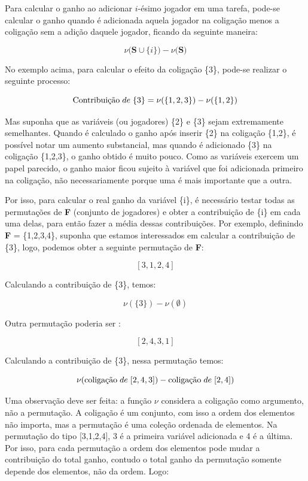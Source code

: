 Para calcular o ganho ao adicionar $i$-ésimo jogador em uma tarefa, 
pode-se calcular o ganho quando é adicionada aquela jogador na coligação menos a coligação sem 
a adição daquele jogador, ficando da seguinte maneira:

\begin{equation}
  \nu({\textbf{S} \cup \{i\})} - \nu({\textbf{S})}    
\end{equation}


No exemplo acima, para calcular o efeito da coligação \{3\}, pode-se realizar o seguinte processo:

\[
\text{Contribuição} \hspace{1mm} de \hspace{1mm} \{3\} = \nu(\{1,2,3\}) - \nu(\{1,2\})  
\]

Mas suponha que as variáveis (ou jogadores) \{2\} e \{3\} sejam extremamente semelhantes. Quando é calculado o 
ganho após inserir \{2\} na coligação \{1,2\}, é possível notar um aumento substancial, mas quando é adicionado 
\{3\} na coligação \{1,2,3\}, o ganho obtido é muito pouco. Como as variáveis exercem um papel parecido,
 o ganho maior ficou sujeito à variável que foi adicionada primeiro na coligação, não necessariamente 
 porque uma é mais importante que a outra. 

Por isso, para calcular o real ganho da variável \{i\}, é necessário testar todas as permutações de \textbf{F} (conjunto de jogadores) e obter a contribuição de \{i\} em cada uma delas, para então fazer a média dessas contribuições. Por exemplo, definindo \textbf{F} = \{1,2,3,4\}, suponha que estamos interessados em calcular a contribuição de \{3\}, logo, podemos obter a seguinte permutação de  \textbf{F}:

$$[3,1,2,4]$$

Calculando a contribuição de \{3\}, temos: 

$$\nu(\{3\}) - \nu(\emptyset) $$

Outra permutação poderia ser :

$$[2,4,3,1]$$

Calculando a contribuição de \{3\}, nessa permutação temos: 

$$\nu(\text{coligação} \hspace{1mm} de \hspace{1mm} [2,4,3]) - \text{coligação} \hspace{1mm} de \hspace{1mm} [2,4]) $$

Uma observação deve ser feita: a função $\nu$ considera a coligação como argumento, não a permutação. A coligação é um conjunto, com isso a ordem dos elementos não importa, mas a permutação é uma coleção ordenada de elementos. Na permutação do tipo [3,1,2,4], 3 é a primeira variável adicionada e 4 é a última. Por isso, para cada permutação a ordem dos elementos pode mudar a contribuição do total ganho, contudo o total ganho da permutação somente depende dos elementos, não da ordem. Logo:

